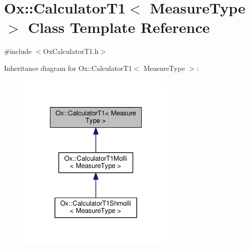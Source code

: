 \hypertarget{class_ox_1_1_calculator_t1}{\section{Ox\-:\-:Calculator\-T1$<$ Measure\-Type $>$ Class Template Reference}
\label{class_ox_1_1_calculator_t1}
}


{\ttfamily \#include $<$Ox\-Calculator\-T1.\-h$>$}



Inheritance diagram for Ox\-:\-:Calculator\-T1$<$ Measure\-Type $>$\-:
\nopagebreak
\begin{figure}[H]
\begin{center}
\leavevmode
\includegraphics[width=216pt]{class_ox_1_1_calculator_t1__inherit__graph}
\end{center}
\end{figure}
